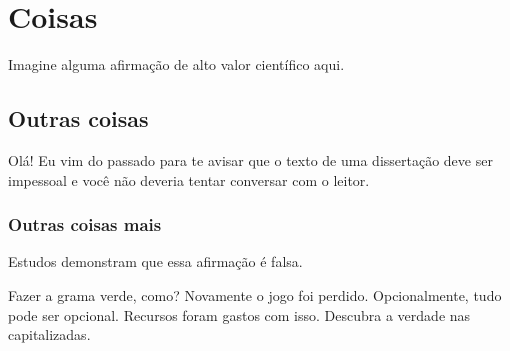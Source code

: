 \documentclass[embeddedlogo]{ufsc-thesis-rn46-2019}
\begin{document}
\section{Coisas}
\label{sec:stuff}
Imagine alguma afirmação de alto valor científico aqui.

\subsection{Outras coisas}
\label{sec:more}
Olá! Eu vim do passado para te avisar que o texto de uma dissertação deve ser
impessoal e você não deveria tentar conversar com o leitor.

\subsubsection{Outras coisas mais}
\label{sec:yet-more}
Estudos demonstram que essa afirmação é falsa.

\label{sec:yet-another}
Fazer a grama verde, como? Novamente o jogo foi perdido. Opcionalmente, tudo
pode ser opcional. Recursos foram gastos com isso. Descubra a verdade nas
capitalizadas.


\postextual

\end{document}
